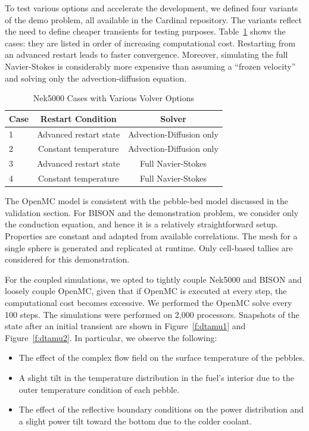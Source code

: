 To test various options and accelerate the development, we defined four
variants of the demo problem, all available in the Cardinal repository. The
variants reflect the need to define cheaper transients for testing purposes.
Table~\ref{tab:nek} shows the cases: they are listed in order of increasing
computational cost. Restarting from an advanced restart leads to faster
convergence. Moreover, simulating the full Navier-Stokes is considerably more
expensive than assuming a ``frozen velocity'' and solving only the
advection-diffusion equation.

\begin{table}
  \centering
  \begin{tabular}{|lcc|}
    \hline \hline
    Case & Restart Condition & Solver \\
    \hline
    1 & Advanced restart state & Advection-Diffusion only \\
    2 & Constant temperature   & Advection-Diffusion only \\
    3 & Advanced restart state & Full Navier-Stokes \\
    4 & Constant temperature   & Full Navier-Stokes \\
    \hline \hline
  \end{tabular}
  \caption{Nek5000 Cases with Various Volver Options}
  \label{tab:nek}
\end{table}

The OpenMC model is consistent with the pebble-bed model discussed in the validation section. For BISON and the demonstration problem, we consider only the conduction equation, and hence it is a relatively straightforward setup. Properties are constant and adapted from available correlations. The mesh for a single sphere is generated and replicated at runtime. Only cell-based tallies are considered for this demonstration.

For the coupled simulations, we opted to tightly couple Nek5000 and BISON and loosely couple OpenMC, given that if OpenMC is executed at every step, the computational cost becomes excessive. We performed the OpenMC solve every 100 steps. The simulations were performed on 2,000 processors. Snapshots of the state after an initial transient are shown in Figure~\ref{f:dtamu1} and Figure~\ref{f:dtamu2}. In particular, we observe the following:
\begin{itemize}
  \item The effect of the complex flow field on the surface temperature of the pebbles.
  \item A slight tilt in the temperature distribution in the fuel's interior due to the outer temperature condition of each pebble.
  \item The effect of the reflective boundary conditions on the power distribution and a slight power tilt toward the bottom due to the colder coolant.
\end{itemize}

